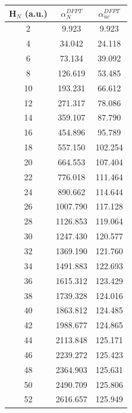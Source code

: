{%

\begin{table}
\begin{tabular}{c|  c c}
\hline \hline
H$_{N}$ (a.u.)  &  $\alpha^{DFPT}_{N}$   & $\alpha^{DFPT}_{uc}$   \\
\hline
2    &  9.923  &  9.923 \\           
4    &  34.042  &  24.118 \\
6    &  73.134  &  39.092 \\
8    &  126.619  &  53.485 \\
10    &  193.231  &  66.612 \\
12    &  271.317  &  78.086 \\
14    &  359.107  &  87.790 \\
16    &  454.896  &  95.789 \\
18    &  557.150  &  102.254 \\
20    &  664.553  &  107.404 \\
22    &  776.018  &  111.464 \\
24    &  890.662  &  114.644 \\
26    &  1007.790  &  117.128 \\
28    &  1126.853  &  119.064 \\
30    &  1247.430  &  120.577 \\
32    &  1369.190  &  121.760 \\
34    &  1491.883  &  122.693 \\
36    &  1615.312  &  123.429 \\
38    &  1739.328  &  124.016 \\
40    &  1863.812  &  124.485 \\
42    &  1988.677  &  124.865 \\
44    &  2113.848  &  125.171 \\
46    &  2239.272  &  125.423 \\
48    &  2364.903  &  125.631 \\
50    &  2490.709  &  125.806 \\
52    &  2616.657  &  125.949 \\

\end{tabular}
\end{table}}
